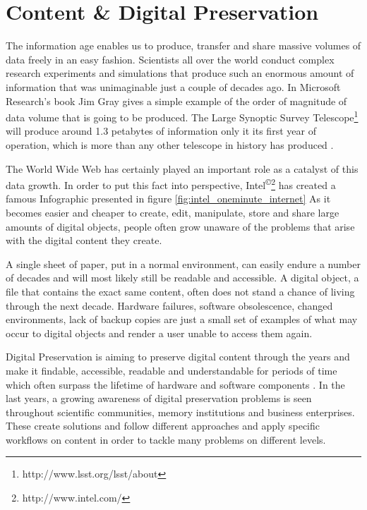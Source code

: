 \section{Content \& Digital Preservation}
The information age enables us to produce, transfer and share massive volumes of data freely in an easy fashion. Scientists all over the world conduct complex research experiments and simulations that produce such an enormous amount of information that was unimaginable just a couple of decades ago. In Microsoft Research's book Jim Gray gives a simple example of the order of magnitude of data volume that is going to be produced. The Large Synoptic Survey Telescope\footnote{http://www.lsst.org/lsst/about} will produce around 1.3 petabytes of information only it its first year of operation, which is more than any other telescope in history has produced \cite{Gray:2009:fourthparadigm}.

The World Wide Web has certainly played an important role as a catalyst of this data growth. In order to put this fact into perspective, Intel\textsuperscript{\copyright}\footnote{http://www.intel.com/} has created a famous Infographic presented in figure \ref{fig:intel_oneminute_internet}
As it becomes easier and cheaper to create, edit, manipulate, store and share large amounts of digital objects, people often grow unaware of the problems that arise with the digital content they create.

A single sheet of paper, put in a normal environment, can easily endure a number of decades and will most likely still be readable and accessible. A digital object, a file that contains the exact same content, often does not stand a chance of living through the next decade. Hardware failures, software obsolescence, changed environments, lack of backup copies are just a small set of examples of what may occur to digital objects and render a user unable to access them again.

Digital Preservation is aiming to preserve digital content through the years and make it findable, accessible, readable and understandable for periods of time which often surpass the lifetime of hardware and software components \cite{DBLP:journals/dlib/RosenthalRLRM05}. In the last years, a growing awareness of digital preservation problems is seen throughout scientific communities, memory institutions and business enterprises. These create solutions and follow different approaches and apply specific workflows on content in order to tackle many problems on different levels.

